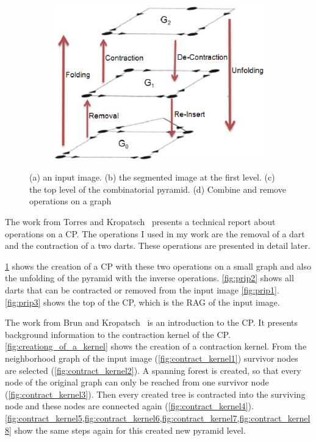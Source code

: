 \documentclass[12pt]{article}
\begin{document}
\begin{figure}[tb]
    \begin{subfigure}[b]{0.4\textwidth}
        \includegraphics[width=\textwidth]{img/combine_remove.jpg}
        \caption{}\label{fig:combine_remove}
    \end{subfigure}

  \caption{(a) an input image. (b) the segmented image at the first level. (c) the top level of the combinatorial pyramid. (d) Combine and remove operations on a graph}\label{fig:prip}
\end{figure}

The work from Torres and Kropatsch~\cite{torrescanonical} presents a technical report about operations on a CP\@.
The operations I used in my work are the removal of a dart and the contraction of a two darts. These operations are presented in detail later.
\par
\cref{fig:combine_remove} shows the creation of a CP with these two operations on a small graph and also the unfolding of the pyramid with the inverse operations. \cref{fig:prip2} shows all darts that can be contracted or removed from the input image \cref{fig:prip1}. \cref{fig:prip3} shows the top of the CP, which is the RAG of the input image.
\par
The work from Brun and Kropatsch~\cite{brun2001introduction} is an introduction to the CP\@. It presents background information to the contraction kernel of the CP\@. \cref{fig:creationg_of_a_kernel} shows the creation of a contraction kernel. From the neighborhood graph of the input image (\cref{fig:contract_kernel1}) survivor nodes are selected (\cref{fig:contract_kernel2}). A spanning forest is created, so that every node of the original graph can only be reached from one survivor node (\cref{fig:contract_kernel3}). Then every created tree is contracted into the surviving node and these nodes are connected again (\cref{fig:contract_kernel4}). \cref{fig:contract_kernel5,fig:contract_kernel6,fig:contract_kernel7,fig:contract_kernel8} show the same steps again for this created new pyramid level.
\par
\end{document}
